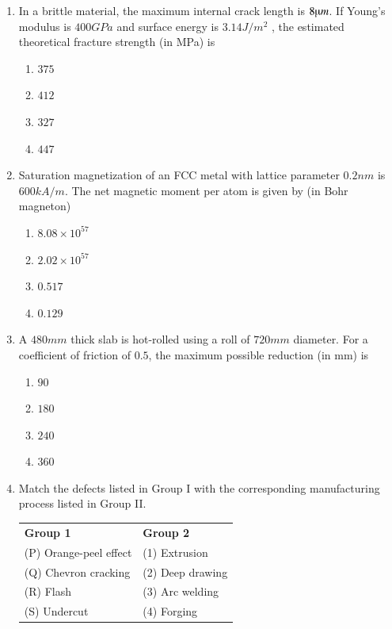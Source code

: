 \documentclass[journal]{IEEEtran}
\theoremstyle{remark}
\begin{document}
\begin{enumerate}
\item  In a brittle material, the maximum internal crack length is $8 \micro m$. If Young's modulus is $400 GPa$ and surface energy is $3.14 J/m^2$ , the estimated theoretical fracture strength (in MPa) is \hfill{}
\begin{multicols}{4}
    \begin{enumerate}
    \item  $375$
    \item  $412$
    \item  $327$
    \item  $447$  
\end{enumerate}
\end{multicols}
\item Saturation magnetization of an FCC metal with lattice parameter $0.2 nm$ is $600 kA/m$. The net magnetic moment per atom is given by (in Bohr magneton)\hfill{}

\begin{multicols}{4}
\begin{enumerate}
        \item $8.08 \times 10^{57}$
        \item  $2.02\times 10^{57}$
        \item  $0.517$ 
        \item $0.129$
\end{enumerate}
\end{multicols}
\item  A $480 mm$ thick slab is hot-rolled using a roll of $720 mm$ diameter. For a coefficient of friction of $0.5$, the maximum possible reduction (in mm) is \hfill{}

\begin{multicols}{4}
\begin{enumerate}
    \item  $90$ 
    \item $180 $
    \item $240$ 
    \item $360 $

\end{enumerate}
\end{multicols}
\item Match the defects listed in Group I with the corresponding manufacturing process listed in Group II.
\hfill{}\\
\begin{center}
\begin{tabular}{ll}
\textbf{Group 1} & \textbf{Group 2}\\
  (P) Orange-peel effect    & (1) Extrusion \\
   (Q) Chevron cracking   & (2) Deep drawing \\
   (R) Flash & (3) Arc welding \\
   (S) Undercut & (4) Forging \\
\end{tabular}
\end{center}
\begin{multicols}{2}
    


\end{multicols}
\end{enumerate}
\end{document}

